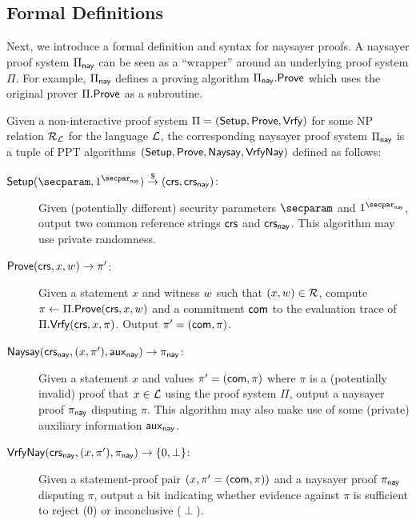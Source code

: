 \subsection{Formal Definitions}\label{sec:naysayer_def}

Next, we introduce a formal definition and syntax for naysayer proofs. A naysayer proof system $\Pi_{\mathsf{nay}}$ can be seen as a ``wrapper'' around an underlying proof system $\Pi$. For example, $\Pi_{\sf nay}$ defines a proving algorithm $\Pi_{\mathsf{nay}}.\mathsf{Prove}$ which uses the original prover $\Pi.\mathsf{Prove}$ as a subroutine.

\begin{definition}\label{def:naysayer_proof}
Given a non-interactive proof system $\Pi = (\mathsf{Setup}, \mathsf{Prove}, \mathsf{Vrfy})$ for some NP relation $\mathcal{R}_{\mathcal{L}}$ for the language $\mathcal{L}$, the corresponding naysayer proof system $\Pi_{\mathsf{nay}}$ is a tuple of PPT algorithms $(\mathsf{Setup}, \mathsf{Prove},\allowbreak \mathsf{Naysay}, {\mathsf{Vrfy}}\mathsf{Nay})$ defined as follows:
    \begin{description}
        \item[$\setup(\secparam, 1^{\naysecparam}) \randout (\crs,\crs_{\nay})$:] Given (potentially different) security parameters $\secparam$ and $1^{\naysecparam}$, output two common reference strings $\mathsf{crs}$ and $\mathsf{crs}_{\mathsf{nay}}$. This algorithm may use private randomness.
        \item[$\mathsf{Prove}(\mathsf{crs}, x, w) \to \pi'$:] Given a statement $x$ and witness $w$ such that $(x,\allowbreak w) \in \mathcal{R}$, compute $\pi \gets \Pi.\mathsf{Prove}(\mathsf{crs}, x,w)$ and a commitment $\mathsf{com}$ to the evaluation trace of $\Pi.\mathsf{Vrfy}(\mathsf{crs}, x, \pi)$. Output $\pi' = (\mathsf{com}, \pi)$.
        \item[$\mathsf{Naysay}(\mathsf{crs}_{\mathsf{nay}}, (x,\pi'), \mathsf{aux}_{\mathsf{nay}}) \rightarrow \pi_{\mathsf{nay}}$:] Given a statement $x$ and values $\pi' = (\mathsf{com},\allowbreak \pi)$ where $\pi$ is a (potentially invalid) proof that $x \in \mathcal{L}$ using the proof system $\Pi$, output a naysayer proof $\pi_{\mathsf{nay}}$ disputing $\pi$. This algorithm may also make use of some (private) auxiliary information $\mathsf{aux}_{\mathsf{nay}}$.
        \item[${\mathsf{Vrfy}}\mathsf{Nay}(\mathsf{crs}_{\mathsf{nay}}, (x,\pi'), \pi_{\mathsf{nay}}) \rightarrow \{0, \perp\}$:] Given a statement-proof pair $(x,\allowbreak \pi'=(\mathsf{com},\allowbreak\pi))$ and a naysayer proof $\pi_{\mathsf{nay}}$ disputing $\pi$, output a bit indicating whether evidence against $\pi$ is sufficient to reject (0) or inconclusive ($\perp$).
    \end{description}
\end{definition}

